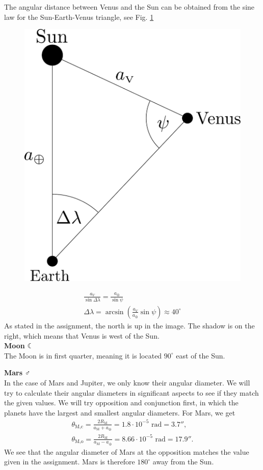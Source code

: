 \documentclass[a4paper,12pt]{extarticle}
\begin{document}
\begin{sol}
\begin{multicols}{2}
The angular distance between Venus and the Sun can be obtained from the sine law for the Sun-Earth-Venus triangle, see Fig. \ref{venus3}

\begin{figure}[H]
	\centering
	\includegraphics[width=0.5\linewidth]{venus_pos2.pdf}
	\caption{}
	\label{venus3}
\end{figure}
\begin{gather*}
	\frac{a_V}{\sin\Delta \lambda}=\frac{a_\oplus}{\sin\psi}\\
	\Delta \lambda =\arcsin\left(\frac{a_V}{a_\oplus}\sin\psi\right) \approx 40^\circ
\end{gather*}
As stated in the assignment, the north is up in the image. The shadow is on the right, which means that Venus is west of the Sun.\\

\textbf{Moon} $\leftmoon$ \\

The Moon is in first quarter, meaning it is located $90^\circ$ east of the Sun.
\end{multicols}

\newpage 
\textbf{Mars} $\Mars$ \\

In the case of Mars and Jupiter, we only know their angular diameter. We will try to calculate their angular diameters in significant aspects to see if they match the given values. We will try opposition and conjunction first, in which the planets have the largest and smallest angular diameters. For Mars, we get
\begin{gather*}
	\theta_{\text{M,c}} = \frac{2R_{\text{M}}}{a_{\text{M}} + a_{\oplus}} = 1.8 \cdot 10^{-5} \text{ rad} = 3.7'',\\
	\theta_{\text{M,o}} = \frac{2R_{\text{M}}}{a_{\text{M}} - a_{\oplus}} = 8.66 \cdot 10^{-5} \text{ rad} = 17.9''.
\end{gather*}
We see that the angular diameter of Mars at the opposition matches the value given in the assignment. Mars is therefore $180^\circ$ away from the Sun.\\


\end{sol}
\end{document}
